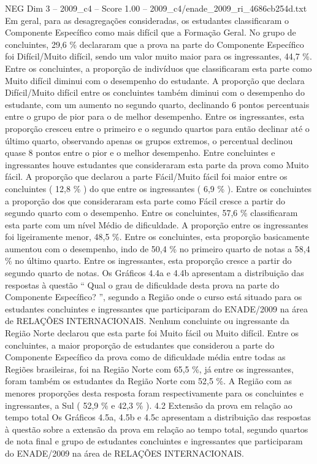 \begin{textsample}{NEG Dim 3 – 2009\_c4 – Score 1.00 – 2009\_c4/enade\_2009\_ri\_4686cb254d.txt}
Em geral, para as desagregações consideradas, os estudantes classificaram o Componente Específico como mais difícil que a Formação Geral.
No grupo de concluintes, 29,6 \% declararam que a prova na parte do Componente Específico foi Difícil/Muito difícil, sendo um valor muito maior para os ingressantes, 44,7 \%.
Entre os concluintes, a proporção de indivíduos que classificaram esta parte como Muito difícil diminui com o desempenho do estudante.
A proporção que declara Difícil/Muito difícil entre os concluintes também diminui com o desempenho do estudante, com um aumento no segundo quarto, declinando 6 pontos percentuais entre o grupo de pior para o de melhor desempenho.
Entre os ingressantes, esta proporção cresceu entre o primeiro e o segundo quartos para então declinar até o último quarto, observando apenas os grupos extremos, o percentual declinou quase 8 pontos entre o pior e o melhor desempenho.
Entre concluintes e ingressantes houve estudantes que consideraram esta parte da prova como Muito fácil.
A proporção que declarou a parte Fácil/Muito fácil foi maior entre os concluintes ( 12,8 \% ) do que entre os ingressantes ( 6,9 \% ).
Entre os concluintes a proporção dos que consideraram esta parte como Fácil cresce a partir do segundo quarto com o desempenho.
Entre os concluintes, 57,6 \% classificaram esta parte com um nível Médio de dificuldade.
A proporção entre os ingressantes foi ligeiramente menor, 48,5 \%.
Entre os concluintes, esta proporção basicamente aumentou com o desempenho, indo de 50,4 \% no primeiro quarto de notas a 58,4 \% no último quarto.
Entre os ingressantes, esta proporção cresce a partir do segundo quarto de notas.
Os Gráficos 4.4a e 4.4b apresentam a distribuição das respostas à questão “ Qual o grau de dificuldade desta prova na parte do Componente Específico? ”, segundo a Região onde o curso está situado para os estudantes concluintes e ingressantes que participaram do ENADE/2009 na área de RELAÇÕES INTERNACIONAIS.
Nenhum concluinte ou ingressante da Região Norte declarou que esta parte foi Muito fácil ou Muito difícil.
Entre os concluintes, a maior proporção de estudantes que considerou a parte do Componente Específico da prova como de dificuldade média entre todas as Regiões brasileiras, foi na Região Norte com 65,5 \%, já entre os ingressantes, foram também os estudantes da Região Norte com 52,5 \%.
A Região com as menores proporções desta resposta foram respectivamente para os concluintes e ingressantes, a Sul ( 52,9 \% e 42,3 \% ). 4.2 Extensão da prova em relação ao tempo total Os Gráficos 4.5a, 4.5b e 4.5c apresentam a distribuição das respostas à questão sobre a extensão da prova em relação ao tempo total, segundo quartos de nota final e grupo de estudantes concluintes e ingressantes que participaram do ENADE/2009 na área de RELAÇÕES INTERNACIONAIS.

\end{textsample}
